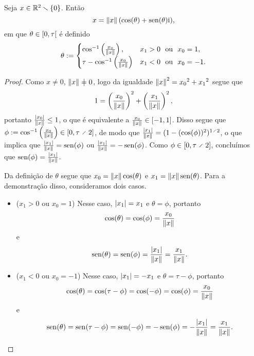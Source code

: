 \begin{proposition}
Seja $x \in \mathbb{R}^2 \smallsetminus \{0\}$. Então
	\begin{equation*}
	x = \left\Vert{x}\right\Vert(\cos(\theta) + \operatorname{sen}(\theta) \mathrm{i}),
	\end{equation*}
em que $\theta \in \left[{0},{\tau}\right[$ é definido
	\begin{equation*}
	\theta :=	\begin{cases}
				\cos^{-1}\left(\frac{x_0}{\left\Vert{x}\right\Vert}\right),			& x_1 > 0 \text{\ \ ou\ \ } x_0 = 1, \\
				\tau - \cos^{-1}\left(\frac{x_0}{\left\Vert{x}\right\Vert}\right)		& x_1 < 0 \text{\ \ ou\ \ } x_0 = -1.
				\end{cases}
	\end{equation*}
\end{proposition}
\begin{proof}
Como $x \neq 0$, $\nor{x} \neq 0$, logo da igualdade $\left\Vert{x}\right\Vert^2 = {x_0}^2 + {x_1}^2$ segue que
	\begin{equation*}
	1 = \left(\frac{x_0}{\left\Vert{x}\right\Vert}\right)^2 + \left(\frac{x_1}{\left\Vert{x}\right\Vert}\right)^2,
	\end{equation*}
portanto $\frac{\left\vert{x_0}\right\vert}{\left\Vert{x}\right\Vert} \leq 1$, o que é equivalente a $\frac{x_0}{\left\Vert{x}\right\Vert} \in \left[{-1},{1}\right]$. Disso segue que $\phi := \cos\inv\left(\frac{x_0}{\nor{x}}\right) \in \intff{0}{\tau \div 2}$, de modo que $\frac{\abs{x_1}}{\nor{x}} = (1-(\cos(\phi))^2)^{1 \div 2}$, o que implica que $\frac{\left\vert{x_1}\right\vert}{\left\Vert{x}\right\Vert} = \operatorname{sen}(\phi)$ ou $\frac{\left\vert{x_1}\right\vert}{\left\Vert{x}\right\Vert} = -\operatorname{sen}(\phi)$. Como $\phi \in \intff{0}{\tau \div 2}$, concluímos que $\operatorname{sen}(\phi) = \frac{\left\vert{x_1}\right\vert}{\left\Vert{x}\right\Vert}$.

Da definição de $\theta$ segue que $x_0 = \left\Vert{x}\right\Vert\cos(\theta)$ e $x_1 = \left\Vert{x}\right\Vert\operatorname{sen}(\theta)$. Para a demonstração disso, consideramos dois casos.
	\begin{itemize}
	\item ($x_1 > 0$ ou $x_0 = 1$) Nesse caso, $\left\vert{x_1}\right\vert=x_1$ e $\theta = \phi$, portanto
		\begin{equation*}
		\cos(\theta) = \cos(\phi) = \frac{x_0}{\left\Vert{x}\right\Vert}
		\end{equation*}
	e
		\begin{equation*}
		\operatorname{sen}(\theta) = \operatorname{sen}(\phi) = \frac{\left\vert{x_1}\right\vert}{\left\Vert{x}\right\Vert} = \frac{x_1}{\left\Vert{x}\right\Vert}.
		\end{equation*}
	
	\item ($x_1 < 0$ ou $x_0 = -1$) Nesse caso, $\left\vert{x_1}\right\vert=-x_1$ e $\theta = \tau - \phi$, portanto
		\begin{equation*}
		\cos(\theta) = \cos(\tau - \phi) = \cos(-\phi) = \cos (\phi)= \frac{x_0}{\left\Vert{x}\right\Vert}
		\end{equation*}
	e
		\begin{equation*}
		\operatorname{sen}(\theta) = \operatorname{sen}(\tau - \phi) = \operatorname{sen}(-\phi) = -\operatorname{sen}(\phi) = -\frac{\left\vert{x_1}\right\vert}{\left\Vert{x}\right\Vert} = \frac{x_1}{\left\Vert{x}\right\Vert}.
		\end{equation*}
	\end{itemize}


\end{proof}
